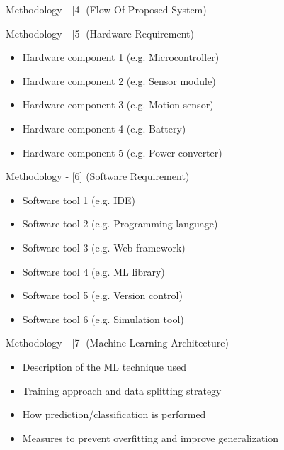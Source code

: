 \begin{frame}{Methodology - [4] (Flow Of Proposed System)}
    \begin{center}
        \vspace{1em}
    \end{center}
\end{frame}

\begin{frame}{Methodology - [5] (Hardware Requirement)}
    \begin{itemize}
        \item Hardware component 1 (e.g. Microcontroller)
        \item Hardware component 2 (e.g. Sensor module)
        \item Hardware component 3 (e.g. Motion sensor)
        \item Hardware component 4 (e.g. Battery)
        \item Hardware component 5 (e.g. Power converter)
    \end{itemize}
\end{frame}

\begin{frame}{Methodology - [6] (Software Requirement)}
    \begin{itemize}
        \item Software tool 1 (e.g. IDE)
        \item Software tool 2 (e.g. Programming language)
        \item Software tool 3 (e.g. Web framework)
        \item Software tool 4 (e.g. ML library)
        \item Software tool 5 (e.g. Version control)
        \item Software tool 6 (e.g. Simulation tool)
    \end{itemize}
\end{frame}

\begin{frame}{Methodology - [7] (Machine Learning Architecture)}
    \begin{itemize}
        \item Description of the ML technique used
        \item Training approach and data splitting strategy
        \item How prediction/classification is performed
        \item Measures to prevent overfitting and improve generalization
    \end{itemize}
\end{frame}

